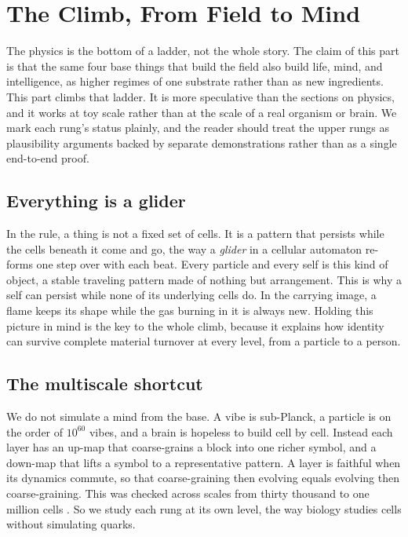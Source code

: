 \section{The Climb, From Field to Mind}

The physics is the bottom of a ladder, not the whole story. The claim of this part is that the same four base things that build the field also build life, mind, and intelligence, as higher regimes of one substrate rather than as new ingredients. This part climbs that ladder. It is more speculative than the sections on physics, and it works at toy scale rather than at the scale of a real organism or brain. We mark each rung's status plainly, and the reader should treat the upper rungs as plausibility arguments backed by separate demonstrations rather than as a single end-to-end proof.

\subsection{Everything is a glider}

In the rule, a thing is not a fixed set of cells. It is a pattern that persists while the cells beneath it come and go, the way a \emph{glider} in a cellular automaton re-forms one step over with each beat. Every particle and every self is this kind of object, a stable traveling pattern made of nothing but arrangement. This is why a self can persist while none of its underlying cells do. In the carrying image, a flame keeps its shape while the gas burning in it is always new. Holding this picture in mind is the key to the whole climb, because it explains how identity can survive complete material turnover at every level, from a particle to a person.

\subsection{The multiscale shortcut}

We do not simulate a mind from the base. A vibe is sub-Planck, a particle is on the order of $10^{60}$ vibes, and a brain is hopeless to build cell by cell. Instead each layer has an up-map that coarse-grains a block into one richer symbol, and a down-map that lifts a symbol to a representative pattern. A layer is faithful when its dynamics commute, so that coarse-graining then evolving equals evolving then coarse-graining. This was checked across scales from thirty thousand to one million cells \cite{pollard2026vibetest}. So we study each rung at its own level, the way biology studies cells without simulating quarks.

